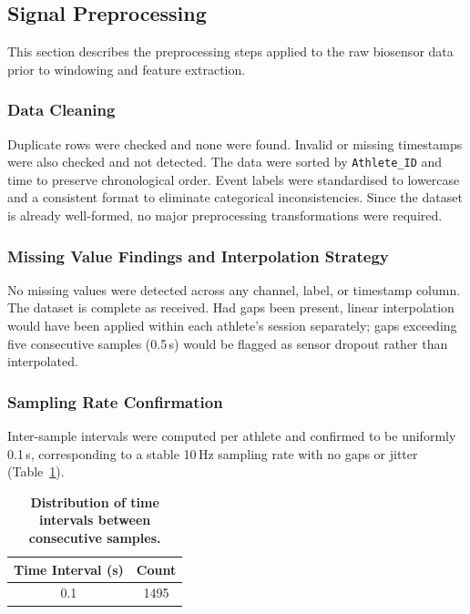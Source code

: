 \documentclass[12pt,a4paper]{cibb}
\begin{document}
\subsection{Signal Preprocessing}
\label{sec:PREPROCESSING}
This section describes the preprocessing steps applied to the raw biosensor data prior to windowing and feature extraction.

\subsubsection{Data Cleaning}
Duplicate rows were checked and none were found. Invalid or missing timestamps were also checked and not detected. The data were sorted by \texttt{Athlete\_ID} and time to preserve chronological order. Event labels were standardised to lowercase and a consistent format to eliminate categorical inconsistencies. Since the dataset is already well-formed, no major preprocessing transformations were required.

\subsubsection{Missing Value Findings and Interpolation Strategy}
No missing values were detected across any channel, label, or timestamp column. The dataset is complete as received. Had gaps been present, linear interpolation would have been applied within each athlete's session separately; gaps exceeding five consecutive samples (0.5\,s) would be flagged as sensor dropout rather than interpolated.

\subsubsection{Sampling Rate Confirmation}
Inter-sample intervals were computed per athlete and confirmed to be uniformly 0.1\,s, corresponding to a stable 10\,Hz sampling rate with no gaps or jitter (Table~\ref{tab:sampling_rate}).

\begin{table}[h]
\centering
\begin{tabular}{cc}
\toprule
\textbf{Time Interval (s)} & \textbf{Count} \\
\midrule
0.1 & 1495 \\
\bottomrule
\end{tabular}
\caption{\textbf{Distribution of time intervals between consecutive samples.}}
\label{tab:sampling_rate}
\end{table}
\end{document}
